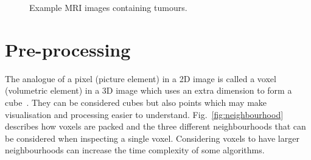 \documentclass[journal]{IEEEtran}
\begin{document}
\begin{figure}[!htb]
	\centering
\caption{Example MRI images containing tumours.}
\label{fig:ex}
\end{figure}











\section{Pre-processing}
\label{sec:pre}

The analogue of a pixel (picture element) in a 2D image is called a voxel (volumetric element) in a 3D image which uses an extra dimension to form a cube~\cite{lohmann1998volumetric}.
They can be considered cubes but also points which may make visualisation and processing easier to understand.
Fig.~\ref{fig:neighbourhood} describes how voxels are packed and the three different neighbourhoods that can be considered when inspecting a single voxel. 
Considering voxels to have larger neighbourhoods can increase the time complexity of some algorithms.
\end{document}
